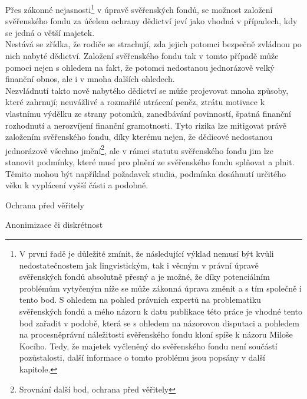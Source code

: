 \documentclass{article}
\begin{document}
 Přes zákonné nejasnosti\footnote{ V první řadě je důležité zmínit, že následující výklad nemusí být kvůli nedostatečnostem jak lingvistickým, tak i věcným v právní úpravě svěřenských fondů absolutně přesný a je možné, že díky potenciálním problémům vytyčeným níže se může zákonná úprava změnit a s tím společně i tento bod. S ohledem na pohled právních expertů na problematiku svěřenských fondů a mého názoru k datu publikace této práce je vhodné tento bod zařadit v podobě, která se s ohledem na názorovou disputaci a pohledem na procesněprávní náležitosti svěřenského fondu kloní spíše k názoru Miloše Kocího. Tedy, že majetek vyčleněný do svěřenského fondu není součástí pozůstalosti, další informace o tomto problému jsou popsány v další kapitole.} v úpravě svěřenských fondů, se možnost založení svěřenského fondu za účelem ochrany dědictví jeví jako vhodná v případech, kdy se jedná o větší majetek.\\
 
 Nestává se zřídka, že rodiče se strachují, zda jejich potomci bezpečně zvládnou po nich nabyté dědictví. Založení svěřenského fondu tak v tomto případě může pomoci nejen s ohledem na fakt, že potomci nedostanou jednorázově velký finanční obnos, ale i v mnoha dalších ohledech.\\
 
 Nezvládnutí takto nově nabytého dědictví se může projevovat mnoha způsoby, které zahrnují; neuvážlivé a rozmařilé utrácení peněz, ztrátu motivace k vlastnímu výdělku ze strany potomků, zanedbávání povinností, špatná finanční rozhodnutí a nerozvíjení finanční gramotnosti. Tyto rizika lze mitigovat právě založením svěřenského fondu, díky kterému nejen, že dědicové nedostanou jednorázově všechno jmění\footnote{Srovnání další bod, ochrana před věřitely}, ale v rámci statutu svěřenského fondu jim lze stanovit podmínky, které musí pro plnění ze svěřenského fondu splňovat a plnit. Těmito mohou být například požadavek studia, podmínka dosáhnutí určitého věku k vyplácení vyšší části a podobně.\\
 
 
  \begin{enumerate}
 {\Large\item[2.] Ochrana před věřitely}
 \end{enumerate}
 
  \begin{enumerate}
 {\Large\item[3.] Anonimizace či diskrétnost}
 \end{enumerate}
 
\end{document}
